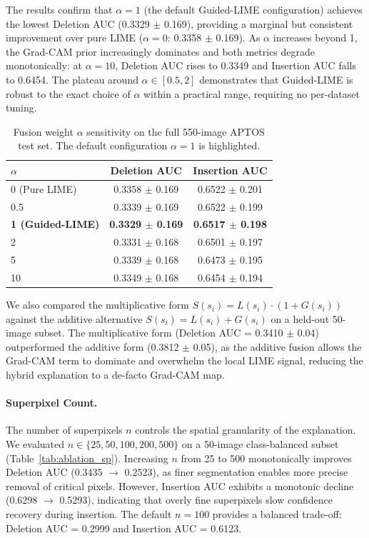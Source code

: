 \documentclass[10pt,twoside]{article}
\begin{document}
The results confirm that $\alpha = 1$ (the default Guided-LIME configuration) achieves the lowest Deletion AUC (0.3329 $\pm$ 0.169), providing a marginal but consistent improvement over pure LIME ($\alpha = 0$: 0.3358 $\pm$ 0.169). As $\alpha$ increases beyond 1, the Grad-CAM prior increasingly dominates and both metrics degrade monotonically: at $\alpha = 10$, Deletion AUC rises to 0.3349 and Insertion AUC falls to 0.6454. The plateau around $\alpha \in [0.5, 2]$ demonstrates that Guided-LIME is robust to the exact choice of $\alpha$ within a practical range, requiring no per-dataset tuning.

\begin{table}[ht]
\caption{Fusion weight $\alpha$ sensitivity on the full 550-image APTOS test set. The default configuration $\alpha=1$ is highlighted.}
\centering
\label{tab:ablation_alpha}
\begin{tabular}{lcc}
\toprule
$\alpha$ & Deletion AUC & Insertion AUC \\
\midrule
0 (Pure LIME) & 0.3358 $\pm$ 0.169 & 0.6522 $\pm$ 0.201 \\
0.5 & 0.3339 $\pm$ 0.169 & 0.6522 $\pm$ 0.199 \\
\textbf{1 (Guided-LIME)} & \textbf{0.3329 $\pm$ 0.169} & \textbf{0.6517 $\pm$ 0.198} \\
2 & 0.3331 $\pm$ 0.168 & 0.6501 $\pm$ 0.197 \\
5 & 0.3339 $\pm$ 0.168 & 0.6473 $\pm$ 0.195 \\
10 & 0.3349 $\pm$ 0.168 & 0.6454 $\pm$ 0.194 \\
\bottomrule
\end{tabular}
\end{table}

We also compared the multiplicative form $S(s_i) = L(s_i) \cdot (1 + G(s_i))$ against the additive alternative $S(s_i) = L(s_i) + G(s_i)$ on a held-out 50-image subset. The multiplicative form (Deletion AUC = 0.3410 $\pm$ 0.04) outperformed the additive form (0.3812 $\pm$ 0.05), as the additive fusion allows the Grad-CAM term to dominate and overwhelm the local LIME signal, reducing the hybrid explanation to a de-facto Grad-CAM map.

\paragraph{Superpixel Count.}
The number of superpixels $n$ controls the spatial granularity of the explanation. We evaluated $n \in \{25, 50, 100, 200, 500\}$ on a 50-image class-balanced subset (Table~\ref{tab:ablation_sp}). Increasing $n$ from 25 to 500 monotonically improves Deletion AUC (0.3435 $\rightarrow$ 0.2523), as finer segmentation enables more precise removal of critical pixels. However, Insertion AUC exhibits a monotonic decline (0.6298 $\rightarrow$ 0.5293), indicating that overly fine superpixels slow confidence recovery during insertion. The default $n = 100$ provides a balanced trade-off: Deletion AUC = 0.2999 and Insertion AUC = 0.6123.
\end{document}
